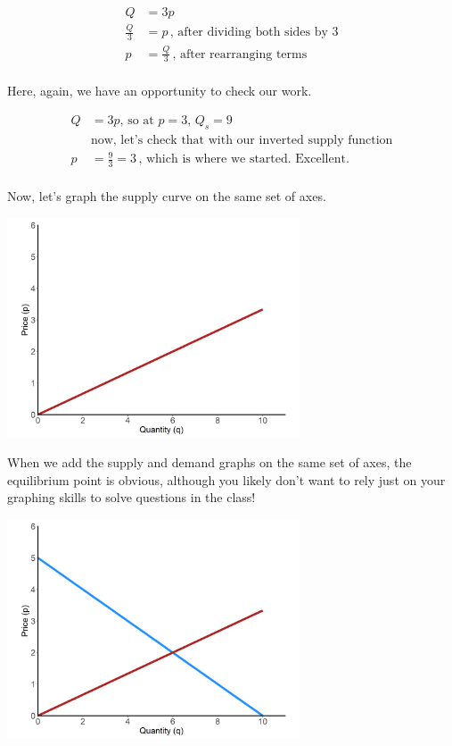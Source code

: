 \documentclass[11pt,]{article}
\begin{document}
\begin{align*}
  Q&=3p\\
  \frac{Q}{3}&=p\,\text{, after dividing both sides by 3}\\
  p&=\frac{Q}{3}\,\text{, after rearranging terms}\\
\end{align*}

Here, again, we have an opportunity to check our work.

\begin{align*}
  Q&=3p,\,\text{so at $p=3$, $Q_s=9$}\\
  &\text{now, let's check that with our inverted supply function}\\
  p&=\frac{9}{3}=3\,\text{, which is where we started. Excellent.}\\
\end{align*}

Now, let's graph the supply curve on the same set of axes.

\begin{center}
\includegraphics[width=0.65\textwidth]{../images/eg_supply.png}
\end{center}

When we add the supply and demand graphs on the same set of axes, the
equilibrium point is obvious, although you likely don't want to rely
just on your graphing skills to solve questions in the class!

\begin{center}
\includegraphics[width=0.65\textwidth]{../images/eg_both.png}
\end{center}
\end{document}
